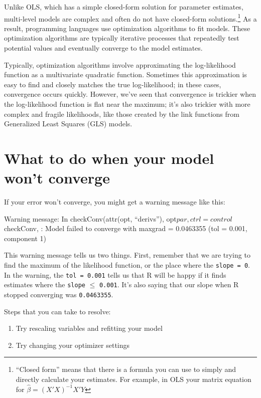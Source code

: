 \documentclass[
  letterpaper,
  DIV=11,
  numbers=noendperiod]{scrreprt}
\begin{document}
Unlike OLS, which has a simple closed-form solution for parameter
estimates, multi-level models are complex and often do not have
closed-form solutions.\footnote{``Closed form'' means that there is a
  formula you can use to simply and directly calculate your estimates.
  For example, in OLS your matrix equation for
  \(\hat{\beta} = (X'X)^{-1}X'Y\)} As a result, programming languages
use optimization algorithms to fit models. These optimization algorithms
are typically iterative processes that repeatedly test potential values
and eventually converge to the model estimates.

Typically, optimization algorithms involve approximating the
log-likelihood function as a multivariate quadratic function. Sometimes
this approximation is easy to find and closely matches the true
log-likelihood; in these cases, convergence occurs quickly. However,
we've seen that convergence is trickier when the log-likelihood function
is flat near the maximum; it's also trickier with more complex and
fragile likelihoods, like those created by the link functions from
Generalized Least Squares (GLS) models.

\hypertarget{what-to-do-when-your-model-wont-converge}{%
\section{What to do when your model won't
converge}\label{what-to-do-when-your-model-wont-converge}}

If your error won't converge, you might get a warning message like this:

Warning message: In checkConv(attr(opt, ``derivs''),
opt\(par, ctrl = control\)checkConv, : Model failed to converge with
max\textbar grad\textbar{} = 0.0463355 (tol = 0.001, component 1)

This warning message tells us two things. First, remember that we are
trying to find the maximum of the likelihood function, or the place
where the \texttt{slope\ =\ 0}. In the warning, the
\texttt{tol\ =\ 0.001} tells us that R will be happy if it finds
estimates where the \texttt{slope} \(\leq\) \texttt{0.001}. It's also
saying that our slope when R stopped converging was \texttt{0.0463355}.

Steps that you can take to resolve:

\begin{enumerate}
  \item Try rescaling variables and refitting your model
  \item Try changing your optimizer settings
\end{enumerate}
\end{document}
